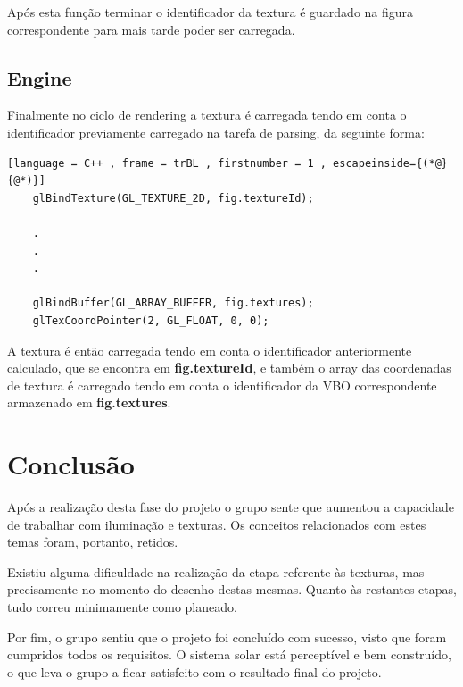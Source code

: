 \documentclass[a4paper]{article}
\begin{document}
Após esta função terminar o identificador da textura é guardado na figura correspondente para mais tarde poder ser carregada.

\newpage
\subsection{Engine}
\label{sec:enginet}

Finalmente no ciclo de rendering a textura é carregada tendo em conta o identificador previamente carregado na tarefa de parsing, da seguinte forma:

\begin{lstlisting}[language = C++ , frame = trBL , firstnumber = 1 , escapeinside={(*@}{@*)}]
	glBindTexture(GL_TEXTURE_2D, fig.textureId);

	.
	.
	.

	glBindBuffer(GL_ARRAY_BUFFER, fig.textures);
	glTexCoordPointer(2, GL_FLOAT, 0, 0);
\end{lstlisting}

A textura é então carregada tendo em conta o identificador anteriormente calculado, que se encontra em \textbf{fig.textureId}, e também o array das coordenadas de textura é carregado tendo em conta o identificador da VBO correspondente armazenado em \textbf{fig.textures}.

\newpage

\section{Conclusão}
\label{sec:conclusao}

Após a realização desta fase do projeto o grupo sente que aumentou a capacidade de trabalhar com iluminação e texturas. Os conceitos relacionados com estes temas foram, portanto, retidos.

Existiu alguma dificuldade na realização da etapa referente às texturas, mas precisamente no momento do desenho destas mesmas. Quanto às restantes etapas, tudo correu minimamente como planeado.

Por fim, o grupo sentiu que o projeto foi concluído com sucesso, visto que foram cumpridos todos os requisitos. O sistema solar está perceptível e bem construído, o que leva o grupo a ficar satisfeito com o resultado final do projeto.
\end{document}
